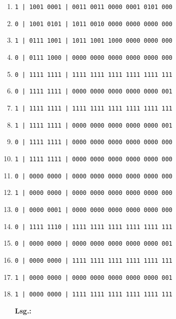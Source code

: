 \documentclass[12pt,a4paper]{scrreprt}
\newcommand{\Lsg}{\par \textbf{Lsg.: }}
\begin{document}
\begin{enumerate}
\item \texttt{1 | 1001 0001 | 0011 0011 0000 0001 0101 000 }
\item \texttt{0 | 1001 0101 | 1011 0010 0000 0000 0000 000 }
\item \texttt{1 | 0111 1001 | 1011 1001 1000 0000 0000 000 }
\item \texttt{0 | 0111 1000 | 0000 0000 0000 0000 0000 000 }
\item \texttt{0 | 1111 1111 | 1111 1111 1111 1111 1111 111 }
\item \texttt{0 | 1111 1111 | 0000 0000 0000 0000 0000 001 }
\item \texttt{1 | 1111 1111 | 1111 1111 1111 1111 1111 111 }
\item \texttt{1 | 1111 1111 | 0000 0000 0000 0000 0000 001 }
\item \texttt{0 | 1111 1111 | 0000 0000 0000 0000 0000 000 }
\item \texttt{1 | 1111 1111 | 0000 0000 0000 0000 0000 000 }
\item \texttt{0 | 0000 0000 | 0000 0000 0000 0000 0000 000 }
\item \texttt{1 | 0000 0000 | 0000 0000 0000 0000 0000 000 }
\item \texttt{0 | 0000 0001 | 0000 0000 0000 0000 0000 000 }
\item \texttt{0 | 1111 1110 | 1111 1111 1111 1111 1111 111 }
\item \texttt{0 | 0000 0000 | 0000 0000 0000 0000 0000 001 }
\item \texttt{0 | 0000 0000 | 1111 1111 1111 1111 1111 111 }
\item \texttt{1 | 0000 0000 | 0000 0000 0000 0000 0000 001 }
\item \texttt{1 | 0000 0000 | 1111 1111 1111 1111 1111 111 }

\Lsg%

\end{enumerate}
\end{document}
